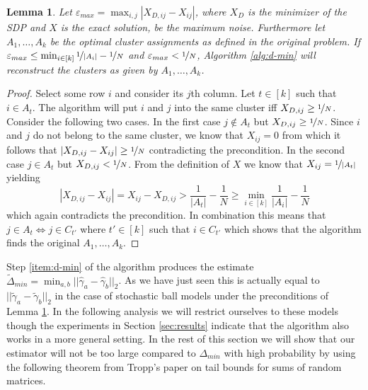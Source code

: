 \documentclass[10pt,a4paper]{article}
\newtheorem{lemma}{Lemma}
\begin{document}
\vspace{0.5em}
\begin{lemma}
  \label{lemma:noise}
  Let $\varepsilon_{max} = \max_{i,j} |X_{D,ij} - X_{ij}|$, where $X_{D}$ is the minimizer of the SDP and $X$ is the exact solution, be the maximum noise.
  Furthermore let $A_{1}, \dots, A_{k}$ be the optimal cluster assignments as defined in the original problem.
  If $\varepsilon_{max} \le \min_{i \in [k]} \nicefrac{1}{|A_{i}|} - \nicefrac{1}{N}$ and $\varepsilon_{max} < \nicefrac{1}{N}$, Algorithm \ref{alg:d-min} will reconstruct the clusters as given by $A_{1}, \dots, A_{k}$.
\end{lemma}

\begin{proof}
  Select some row $i$ and consider its $j$th column.
  Let $t \in [k]$ such that $i \in A_{t}$.
  The algorithm will put $i$ and $j$ into the same cluster iff $X_{D,ij} \ge \nicefrac{1}{N}$.
  Consider the following two cases.
  In the first case $j \not\in A_{t}$ but $X_{D,ij} \ge \nicefrac{1}{N}$.
  Since $i$ and $j$ do not belong to the same cluster, we know that $X_{ij} = 0$ from which it follows that $|X_{D,ij} - X_{ij}| \ge \nicefrac{1}{N}$ contradicting the precondition.
  In the second case $j \in A_{t}$ but $X_{D,ij} < \nicefrac{1}{N}$.
  From the definition of $X$ we know that $X_{ij} = \nicefrac{1}{|A_{t}|}$ yielding
  \begin{equation*}
    |X_{D,ij} - X_{ij}| = X_{ij} - X_{D,ij} > \frac{1}{|A_{t}|} - \frac{1}{N} \ge \min_{i \in [k]} \frac{1}{|A_{i}|} - \frac{1}{N}
  \end{equation*}
  which again contradicts the precondition.
  In combination this means that $j \in A_{t} \Leftrightarrow j \in C_{t'}$ where $t' \in [k]$ such that $i \in C_{t'}$ which shows that the algorithm finds the original $A_{1}, \dots, A_{k}$.
\end{proof}

Step \ref{item:d-min} of the algorithm produces the estimate $\tilde{\Delta}_{min} = \min_{a, b} ||\hat{\gamma}_{a} - \hat{\gamma}_{b}||_{2}$.
As we have just seen this is actually equal to $||\tilde{\gamma}_{a} - \tilde{\gamma}_{b}||_{2}$ in the case of stochastic ball models under the preconditions of Lemma \ref{lemma:noise}.
In the following analysis we will restrict ourselves to these models though the experiments in Section \ref{sec:results} indicate that the algorithm also works in a more general setting.
In the rest of this section we will show that our estimator will not be too large compared to $\Delta_{min}$ with high probability by using the following theorem from Tropp's paper \cite{tailbounds} on tail bounds for sums of random matrices.
\end{document}
